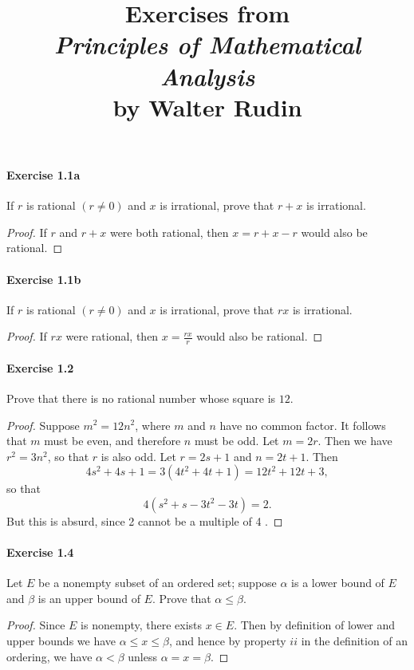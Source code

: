 \documentclass{article}
\title{\textbf{
Exercises from \\
\textit{Principles of Mathematical Analysis} \\
by Walter Rudin
}}
\date{}
\theoremstyle{definition}
\begin{document}
\maketitle

\paragraph{Exercise 1.1a} If $r$ is rational $(r \neq 0)$ and $x$ is irrational, prove that $r+x$ is irrational.
\begin{proof}
    If $r$ and $r+x$ were both rational, then $x=r+x-r$ would also be rational.
\end{proof}


\paragraph{Exercise 1.1b} If $r$ is rational $(r \neq 0)$ and $x$ is irrational, prove that $rx$ is irrational.
\begin{proof}
    If $r x$ were rational, then $x=\frac{r x}{r}$ would also be rational.
\end{proof}


\paragraph{Exercise 1.2} Prove that there is no rational number whose square is $12$.
\begin{proof}
    Suppose $m^2=12 n^2$, where $m$ and $n$ have no common factor. It follows that $m$ must be even, and therefore $n$ must be odd. Let $m=2 r$. Then we have $r^2=3 n^2$, so that $r$ is also odd. Let $r=2 s+1$ and $n=2 t+1$. Then
$$
4 s^2+4 s+1=3\left(4 t^2+4 t+1\right)=12 t^2+12 t+3,
$$
so that
$$
4\left(s^2+s-3 t^2-3 t\right)=2 .
$$
But this is absurd, since 2 cannot be a multiple of 4 .
\end{proof}


\paragraph{Exercise 1.4} Let $E$ be a nonempty subset of an ordered set; suppose $\alpha$ is a lower bound of $E$ and $\beta$ is an upper bound of $E$. Prove that $\alpha \leq \beta$.
\begin{proof}
Since $E$ is nonempty, there exists $x \in E$. Then by definition of lower and upper bounds we have $\alpha \leq x \leq \beta$, and hence by property $i i$ in the definition of an ordering, we have $\alpha<\beta$ unless $\alpha=x=\beta$.
\end{proof}
\end{document}
